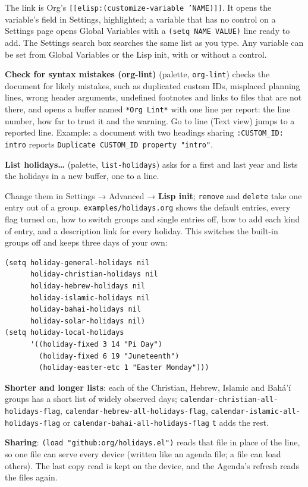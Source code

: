 \documentclass[11pt]{article}
\begin{document}
The link is Org's \texttt{[[elisp:(customize-variable 'NAME)]]}. It opens the variable's field in Settings, highlighted; a variable that has no control on a Settings page opens Global Variables with a \texttt{(setq NAME VALUE)} line ready to add. The Settings search box searches the same list as you type. Any variable can be set from Global Variables or the Lisp init, with or without a control.

\textbf{Check for syntax mistakes (org-lint)} (palette, \texttt{org-lint}) checks the document for likely mistakes, such as duplicated custom IDs, misplaced planning lines, wrong header arguments, undefined footnotes and links to files that are not there, and opens a buffer named \texttt{*Org Lint*} with one line per report: the line number, how far to trust it and the warning. Go to line (Text view) jumps to a reported line. Example: a document with two headings sharing \texttt{:CUSTOM\_ID: intro} reports \texttt{Duplicate CUSTOM\_ID property "intro"}.

\textbf{List holidays…} (palette, \texttt{list-holidays}) asks for a first and last year and lists the holidays in a new buffer, one to a line.

Change them in Settings → Advanced → \textbf{Lisp init}; \texttt{remove} and \texttt{delete} take one entry out of a group. \texttt{examples/holidays.org} shows the default entries, every flag turned on, how to switch groups and single entries off, how to add each kind of entry, and a description link for every holiday. This switches the built-in groups off and keeps three days of your own:

\begin{verbatim}
(setq holiday-general-holidays nil
      holiday-christian-holidays nil
      holiday-hebrew-holidays nil
      holiday-islamic-holidays nil
      holiday-bahai-holidays nil
      holiday-solar-holidays nil)
(setq holiday-local-holidays
      '((holiday-fixed 3 14 "Pi Day")
        (holiday-fixed 6 19 "Juneteenth")
        (holiday-easter-etc 1 "Easter Monday")))
\end{verbatim}

\textbf{Shorter and longer lists}: each of the Christian, Hebrew, Islamic and Bahá'í groups has a short list of widely observed days; \texttt{calendar-christian-all-holidays-flag}, \texttt{calendar-hebrew-all-holidays-flag}, \texttt{calendar-islamic-all-holidays-flag} or \texttt{calendar-bahai-all-holidays-flag} \texttt{t} adds the rest.

\textbf{Sharing}: \texttt{(load "github:org/holidays.el")} reads that file in place of the line, so one file can serve every device (written like an agenda file; a file can load others). The last copy read is kept on the device, and the Agenda's refresh reads the files again.
\end{document}
